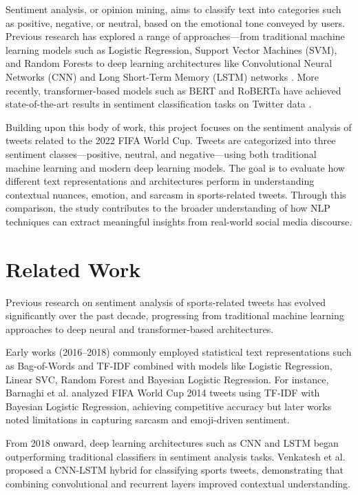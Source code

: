 \documentclass[10pt]{article}
\begin{document}
Sentiment analysis, or opinion mining, aims to classify text into categories such as positive, negative, or neutral, based on the emotional tone conveyed by users. Previous research has explored a range of approaches—from traditional machine learning models such as Logistic Regression, Support Vector Machines (SVM), and Random Forests \cite{ref1} to deep learning architectures like Convolutional Neural Networks (CNN) and Long Short-Term Memory (LSTM) networks \cite{ref2}. More recently, transformer-based models such as BERT and RoBERTa have achieved state-of-the-art results in sentiment classification tasks on Twitter data \cite{ref3, ref4}.

Building upon this body of work, this project focuses on the sentiment analysis of tweets related to the 2022 FIFA World Cup. Tweets are categorized into three sentiment classes—positive, neutral, and negative—using both traditional machine learning and modern deep learning models. The goal is to evaluate how different text representations and architectures perform in understanding contextual nuances, emotion, and sarcasm in sports-related tweets. Through this comparison, the study contributes to the broader understanding of how NLP techniques can extract meaningful insights from real-world social media discourse.
\section{Related Work}
Previous research on sentiment analysis of sports-related tweets has evolved significantly over the past decade, progressing from traditional machine learning approaches to deep neural and transformer-based architectures. 

Early works (2016–2018) commonly employed statistical text representations such as Bag-of-Words and TF-IDF combined with models like Logistic Regression, Linear SVC, Random Forest and Bayesian Logistic Regression. For instance, Barnaghi et al. \cite{ref1} analyzed FIFA World Cup 2014 tweets using TF-IDF with Bayesian Logistic Regression, achieving competitive accuracy but later works noted limitations in capturing sarcasm and emoji-driven sentiment.

From 2018 onward, deep learning architectures such as CNN and LSTM began outperforming traditional classifiers in sentiment analysis tasks. Venkatesh et al. \cite{ref2} proposed a CNN-LSTM hybrid for classifying sports tweets, demonstrating that combining convolutional and recurrent layers improved contextual understanding.
\end{document}
